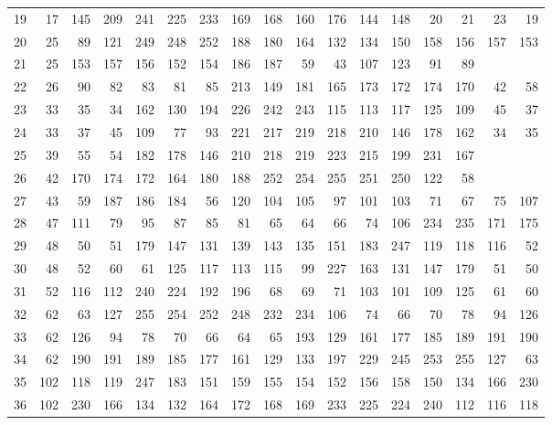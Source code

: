 \documentclass[11pt]{article}
\theoremstyle{remark}
\begin{document}
\begin{center}
\begin{tabular}{r|rrrrrrrrrrrrrrrr}
19 & 17 & 145 & 209 & 241 & 225 & 233 & 169 & 168 & 160 & 176 & 144 & 148 & 20 & 21 & 23 & 19 \\
20 & 25 & 89 & 121 & 249 & 248 & 252 & 188 & 180 & 164 & 132 & 134 & 150 & 158 & 156 & 157 & 153 \\
21 & 25 & 153 & 157 & 156 & 152 & 154 & 186 & 187 & 59 & 43 & 107 & 123 & 91 & 89 &  &  \\
22 & 26 & 90 & 82 & 83 & 81 & 85 & 213 & 149 & 181 & 165 & 173 & 172 & 174 & 170 & 42 & 58 \\
23 & 33 & 35 & 34 & 162 & 130 & 194 & 226 & 242 & 243 & 115 & 113 & 117 & 125 & 109 & 45 & 37 \\
24 & 33 & 37 & 45 & 109 & 77 & 93 & 221 & 217 & 219 & 218 & 210 & 146 & 178 & 162 & 34 & 35 \\
25 & 39 & 55 & 54 & 182 & 178 & 146 & 210 & 218 & 219 & 223 & 215 & 199 & 231 & 167 &  &  \\
26 & 42 & 170 & 174 & 172 & 164 & 180 & 188 & 252 & 254 & 255 & 251 & 250 & 122 & 58 &  &  \\
27 & 43 & 59 & 187 & 186 & 184 & 56 & 120 & 104 & 105 & 97 & 101 & 103 & 71 & 67 & 75 & 107 \\
28 & 47 & 111 & 79 & 95 & 87 & 85 & 81 & 65 & 64 & 66 & 74 & 106 & 234 & 235 & 171 & 175 \\
29 & 48 & 50 & 51 & 179 & 147 & 131 & 139 & 143 & 135 & 151 & 183 & 247 & 119 & 118 & 116 & 52 \\
30 & 48 & 52 & 60 & 61 & 125 & 117 & 113 & 115 & 99 & 227 & 163 & 131 & 147 & 179 & 51 & 50 \\
31 & 52 & 116 & 112 & 240 & 224 & 192 & 196 & 68 & 69 & 71 & 103 & 101 & 109 & 125 & 61 & 60 \\
32 & 62 & 63 & 127 & 255 & 254 & 252 & 248 & 232 & 234 & 106 & 74 & 66 & 70 & 78 & 94 & 126 \\
33 & 62 & 126 & 94 & 78 & 70 & 66 & 64 & 65 & 193 & 129 & 161 & 177 & 185 & 189 & 191 & 190 \\
34 & 62 & 190 & 191 & 189 & 185 & 177 & 161 & 129 & 133 & 197 & 229 & 245 & 253 & 255 & 127 & 63 \\
35 & 102 & 118 & 119 & 247 & 183 & 151 & 159 & 155 & 154 & 152 & 156 & 158 & 150 & 134 & 166 & 230 \\
36 & 102 & 230 & 166 & 134 & 132 & 164 & 172 & 168 & 169 & 233 & 225 & 224 & 240 & 112 & 116 & 118 \\
\end{tabular}
\end{center}
\end{document}
